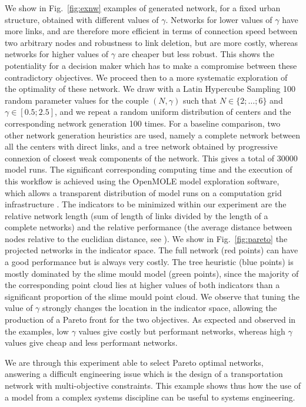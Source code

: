 \documentclass[runningheads,a4paper]{llncs2e/llncs}
\begin{document}
We show in Fig.~\ref{fig:exnw} examples of generated network, for a fixed urban structure, obtained with different values of $\gamma$. Networks for lower values of $\gamma$ have more links, and are therefore more efficient in terms of connection speed between two arbitrary nodes and robustness to link deletion, but are more costly, whereas networks for higher values of $\gamma$ are cheaper but less robust. This shows the potentiality for a decision maker which has to make a compromise between these contradictory objectives. We proceed then to a more systematic exploration of the optimality of these network. We draw with a Latin Hypercube Sampling 100 random parameter values for the couple $(N,\gamma)$ such that $N \in \{ 2 ; \ldots ; 6 \}$ and $\gamma \in \left[ 0.5 ; 2.5\right]$, and we repeat a random uniform distribution of centers and the corresponding network generation 100 times. For a baseline comparison, two other network generation heuristics are used, namely a complete network between all the centers with direct links, and a tree network obtained by progressive connexion of closest weak components of the network. This gives a total of 30000 model runs. The significant corresponding computing time and the execution of this workflow is achieved using the OpenMOLE model exploration software, which allows a transparent distribution of model runs on a computation grid infrastructure \cite{reuillon2013openmole}. The indicators to be minimized within our experiment are the relative network length (sum of length of links divided by the length of a complete networks) and the relative performance (the average distance between nodes relative to the euclidian distance, see \cite{banos2012towards}). We show in Fig.~\ref{fig:pareto} the projected networks in the indicator space. The full network (red points) can have a good performance but is always very costly. The tree heuristic (blue points) is mostly dominated by the slime mould model (green points), since the majority of the corresponding point cloud lies at higher values of both indicators than a significant proportion of the slime mould point cloud. We observe that tuning the value of $\gamma$ strongly changes the location in the indicator space, allowing the production of a Pareto front for the two objectives. As expected and observed in the examples, low $\gamma$ values give costly but performant networks, whereas high $\gamma$ values give cheap and less performant networks.

We are through this experiment able to select Pareto optimal networks, answering a difficult engineering issue which is the design of a transportation network with multi-objective constraints. This example shows thus how the use of a model from a complex systems discipline can be useful to systems engineering.
\end{document}
